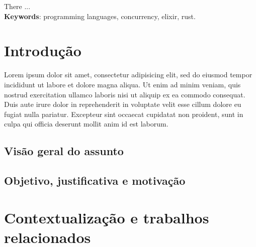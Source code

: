 \documentclass{abnt}
\begin{document}





 

\capa
\folhaderosto

\begin{resumo}
There ...\\

\textbf{Keywords}: programming languages, concurrency, elixir, rust.
\end{resumo}

\sumario
\listoffigures

\chapter{Introdução}

Lorem ipsum dolor sit amet, consectetur adipisicing elit, sed do eiusmod tempor incididunt ut labore et dolore magna aliqua. Ut enim ad minim veniam, quis nostrud exercitation ullamco laboris nisi ut aliquip ex ea commodo consequat. Duis aute irure dolor in reprehenderit in voluptate velit esse cillum dolore eu fugiat nulla pariatur. Excepteur sint occaecat cupidatat non proident, sunt in culpa qui officia deserunt mollit anim id est laborum.

\section{Visão geral do assunto}

\section{Objetivo, justificativa e motivação}

\chapter{Contextualização e trabalhos relacionados}
\end{document}

